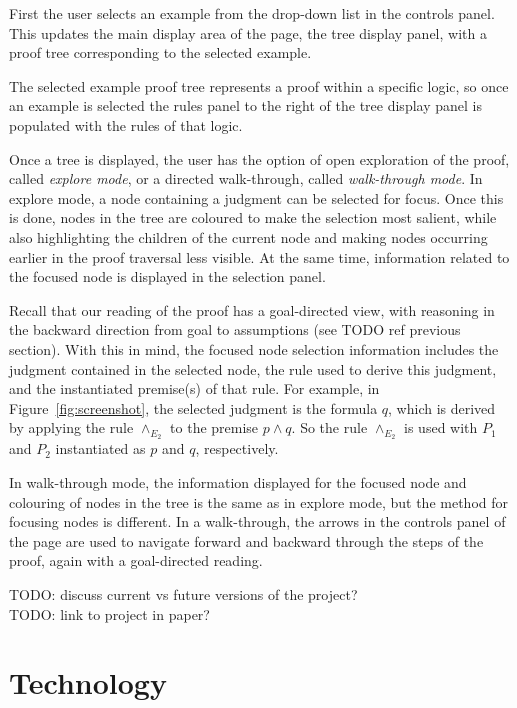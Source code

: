 \documentclass[conference]{IEEEtran}
\begin{document}
First the user selects an example from the drop-down list in the controls panel. This updates the main display area of the page, the tree display panel, with a proof tree corresponding to the selected example.

The selected example proof tree represents a proof within a specific logic, so once an example is selected the rules panel to the right of the tree display panel is populated with the rules of that logic.

Once a tree is displayed, the user has the option of open exploration of the proof, called \textit{explore mode}, or a directed walk-through, called \textit{walk-through mode}. In explore mode, a node containing a judgment can be selected for focus. Once this is done, nodes in the tree are coloured to make the selection most salient, while also highlighting the children of the current node and making nodes occurring earlier in the proof traversal less visible. At the same time, information related to the focused node is displayed in the selection panel.

Recall that our reading of the proof has a goal-directed view, with reasoning in the backward direction from goal to assumptions (see TODO ref previous section). With this in mind, the focused node selection information includes the judgment contained in the selected node, the rule used to derive this judgment, and the instantiated premise(s) of that rule. For example, in Figure~\ref{fig:screenshot}, the selected judgment is the formula $q$, which is derived by applying the rule $\wedge_{E_2}$ to the premise $p \wedge q$. So the rule $\wedge_{E_2}$ is used with $P_1$ and $P_2$ instantiated as $p$ and $q$, respectively.

In walk-through mode, the information displayed for the focused node and colouring of nodes in the tree is the same as in explore mode, but the method for focusing nodes is different. In a walk-through, the arrows in the controls panel of the page are used to navigate forward and backward through the steps of the proof, again with a goal-directed reading.

TODO: discuss current vs future versions of the project? \\

TODO: link to project in paper? \\


\section{Technology}
\label{sec:technology}
\end{document}
